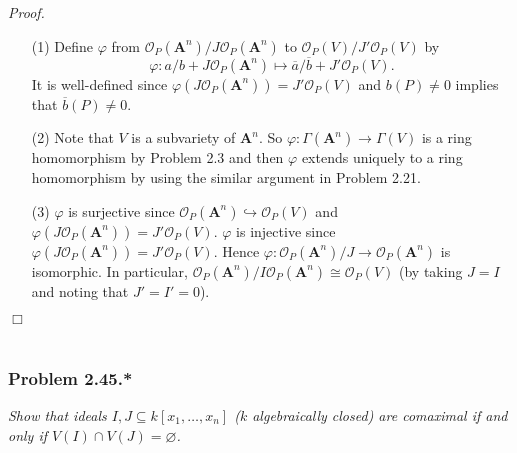 \documentclass{article}
\begin{document}
\emph{Proof.}
\begin{enumerate}
\item[(1)]
  Define $\varphi$ from
  $\mathscr{O}_P(\mathbf{A}^{n})/J \mathscr{O}_P(\mathbf{A}^{n})$
  to $\mathscr{O}_P(V) / J'\mathscr{O}_P(V)$ by
  \[
    \varphi: a/b + J \mathscr{O}_P(\mathbf{A}^{n})
    \mapsto \overline{a}/\overline{b} + J' \mathscr{O}_P(V).
  \]
  It is well-defined since $\varphi(J \mathscr{O}_P(\mathbf{A}^{n})) = J' \mathscr{O}_P(V)$
  and $b(P) \neq 0$ implies that $\overline{b}(P) \neq 0$.

\item[(2)]
  Note that $V$ is a subvariety of $\mathbf{A}^{n}$.
  So $\varphi: \Gamma(\mathbf{A}^{n}) \to \Gamma(V)$ is a ring homomorphism by Problem 2.3
  and then $\varphi$ extends uniquely to a ring homomorphism
  by using the similar argument in Problem 2.21.

\item[(3)]
  $\varphi$ is surjective since
  $\mathscr{O}_P(\mathbf{A}^{n}) \hookrightarrow \mathscr{O}_P(V)$
  and $\varphi(J \mathscr{O}_P(\mathbf{A}^{n})) = J' \mathscr{O}_P(V)$.
  $\varphi$ is injective since $\varphi(J \mathscr{O}_P(\mathbf{A}^{n})) = J' \mathscr{O}_P(V)$.
  Hence $\varphi: \mathscr{O}_P(\mathbf{A}^{n})/J \to \mathscr{O}_P(\mathbf{A}^{n})$
  is isomorphic.
  In particular,
  $\mathscr{O}_P(\mathbf{A}^{n}) / I\mathscr{O}_P(\mathbf{A}^{n}) \cong \mathscr{O}_P(V)$
  (by taking $J = I$ and noting that $J' = I' = 0$).
\end{enumerate}
$\Box$ \\\\






\subsubsection*{Problem 2.45.*}
\emph{Show that ideals $I, J \subseteq k[x_1,\ldots,x_n]$ ($k$ algebraically closed) are comaximal
if and only if $V(I) \cap V(J) = \varnothing$.} \\
\end{document}
